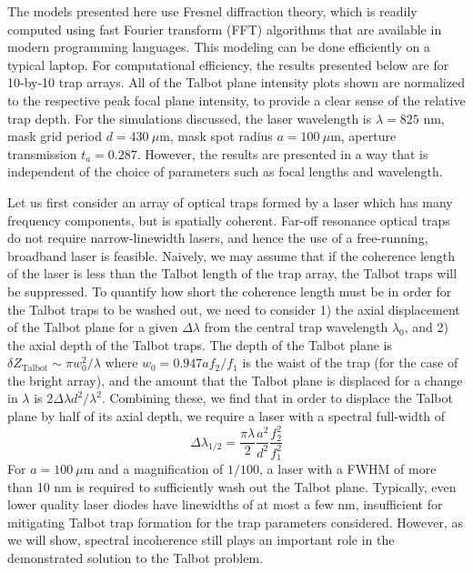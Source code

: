 The models presented here use Fresnel diffraction theory, which is readily computed using fast Fourier transform (FFT) algorithms that are available in modern programming languages\cite{kelly2014}. This modeling can be done efficiently on a typical laptop. For computational efficiency, the results presented below are for 10-by-10 trap arrays. All of the Talbot plane intensity plots shown are normalized to the respective peak focal plane intensity, to provide a clear sense of the relative trap depth. For the simulations discussed, the laser wavelength is $\lambda =825 $ nm, mask grid period $d=430~ \mu$m, mask spot radius $a=100~\mu$m, aperture transmission $t_a=0.287$. However, the results are presented in a way that is independent of the choice of parameters such as focal lengths and wavelength.

Let us first consider an array of optical traps formed by a laser which has many frequency components, but is spatially coherent. Far-off resonance optical traps do not require narrow-linewidth lasers, and hence the use of a free-running, broadband laser is feasible. Naively, we may assume that if the coherence length of the laser is less than the Talbot length of the trap array, the Talbot traps will be suppressed. To quantify how short the coherence length must be in order for the Talbot traps to be washed out, we need to consider 1) the axial displacement of the Talbot plane for a given $\Delta \lambda$ from the central trap wavelength $\lambda_0$, and 2) the axial depth of the Talbot traps. The depth of the Talbot plane is $\delta Z_{\textrm{Talbot}} \sim \pi w_0^2/\lambda$ where $w_0=0.947af_2/f_1$ is the waist of the trap (for the case of the bright array), and the amount that the Talbot plane is displaced for a change in $\lambda$ is $2 \Delta \lambda d^2/\lambda^2$. Combining these, we find that in order to displace the Talbot plane by half of its axial depth, we require a laser with a spectral full-width of 
\begin{equation}
    \Delta \lambda_{1/2} = \frac{\pi \lambda}{2} \frac{a^2}{d^2} \frac{f_2^2}{f_1^2}
\end{equation}
For $a=100~\mu$m and a magnification of $1/100$, a laser with a FWHM of more than 10 nm is required to sufficiently wash out the Talbot plane. Typically, even lower quality laser diodes have linewidths of at most a few nm, insufficient for mitigating Talbot trap formation for the trap parameters considered. However, as we will show, spectral incoherence still plays an important role in the demonstrated solution to the Talbot problem.


